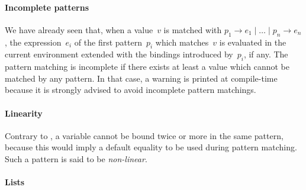 \paragraph{Incomplete patterns}

We have already seen that, when a value~\(v\) is matched with \(p_1
\rightarrow e_1 \mid \ldots \mid p_n \rightarrow e_n\), the
expression~\(e_i\) of the first pattern~\(p_i\) which matches~\(v\) is
evaluated in the current environment extended with the bindings
introduced by~\(p_i\), if any. The pattern matching is incomplete if
there exists at least a value which cannot be matched by any
pattern. In that case, a warning is printed at compile\hyp{}time
because it is strongly advised to avoid incomplete pattern matchings.

\bigskip

\noindent{}

\noindent{}

\noindent{}

\noindent{}

\noindent{}

\bigskip

\paragraph{Linearity}

Contrary to \Erlang, a variable cannot be bound twice or more in the
same pattern, because this would imply a default equality to be used
during pattern matching. Such a pattern is said to be
\emph{non\hyp{}linear}.

\medskip

\noindent{}

\noindent{}

\noindent{}

\paragraph{Lists}

